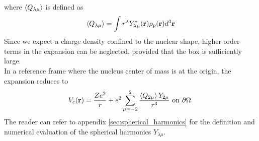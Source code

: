 where $\expval{Q_{\lambda\mu}}$ is defined as 
\begin{equation}
    \expval{Q_{\lambda\mu}} = \int r^\lambda Y_{\lambda\mu}^* (\mathbf r)\rho_p(\mathbf r ) d^3 \mathbf r
\end{equation}
Since we expect a charge density confined to the nuclear shape, higher order terms in the expansion can be neglected, provided that the box is sufficiently large.
\\In a reference frame where the nucleus center of mass is at the origin, the expansion reduces to
\begin{equation}
    V_{c}(\mathbf r ) = \frac{Ze^2}{r} + e^2\sum_{\mu=-2}^{2}\frac{\expval{Q_{2\mu}}Y_{2\mu}}{r^3} \text{ on } \partial \Omega.
\end{equation}
The reader can refer to appendix \ref{sec:spherical_harmonics} for the definition and numerical evaluation of the spherical harmonics $Y_{\lambda\mu}$.